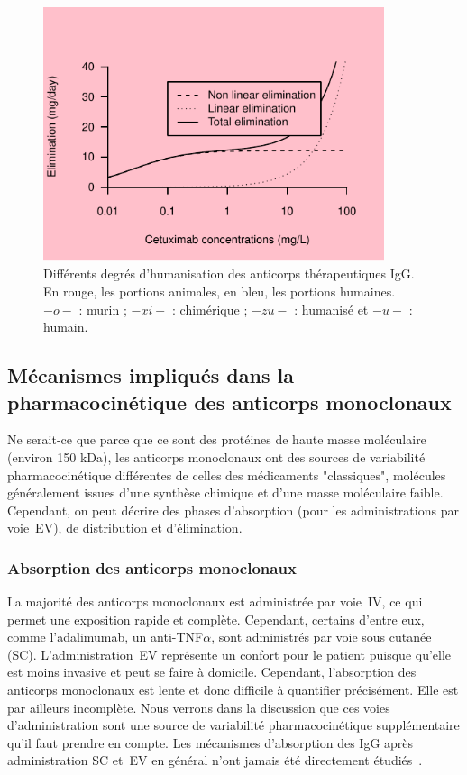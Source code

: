 \begin{figure}[htbp]
	\centering
		\includegraphics[width=10cm]{images/essai001.pdf}
	\caption[Différents degrés d'humanisation des anticorps thérapeutiques IgG.]{Différents degrés d'humanisation des anticorps thérapeutiques IgG. En rouge, les portions animales, en bleu, les portions humaines. $-o-$ : murin ; $-xi-$ : chimérique ; $-zu-$ : humanisé et $-u-$ : humain.}
	\label{fig:12}
\end{figure}

\subsection{Mécanismes impliqués dans la pharmacocinétique des anticorps monoclonaux}
Ne serait-ce que parce que ce sont des protéines de haute masse moléculaire (environ 150 kDa), les anticorps monoclonaux ont des sources de variabilité pharmacocinétique différentes de celles des médicaments "classiques", molécules généralement issues d'une synthèse chimique et d'une masse moléculaire faible. Cependant, on peut décrire des phases d'absorption (pour les administrations par voie~EV), de distribution et d'élimination.

\subsubsection{Absorption des anticorps monoclonaux}
La majorité des anticorps monoclonaux est administrée par voie~IV, ce qui permet une exposition rapide et complète. Cependant, certains d'entre eux, comme l'adalimumab, un anti-TNF$\alpha$, sont administrés par voie sous cutanée (SC). L'administration~EV représente un confort pour le patient puisque qu'elle est moins invasive et peut se faire à domicile. Cependant, l'absorption des anticorps monoclonaux est lente et donc difficile à quantifier précisément. Elle est par ailleurs incomplète. Nous verrons dans la discussion que ces voies d'administration sont une source de variabilité pharmacocinétique supplémentaire qu'il faut prendre en compte. Les mécanismes d'absorption des IgG après administration SC et~EV en général n'ont jamais été directement étudiés~\citep{REF18}. 

